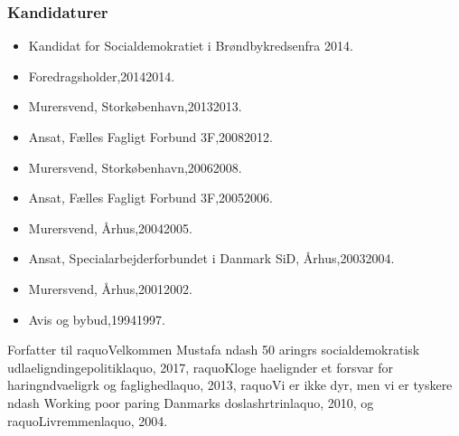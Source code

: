 \documentclass[11pt, a4paper]{awesome-cv}
\begin{document}
\begin{cvletter}
\subsubsection*{Kandidaturer}
\begin{itemize}
\item Kandidat for Socialdemokratiet i Brøndbykredsenfra 2014.
\end{itemize}
\begin{itemize}
\item Foredragsholder,20142014.
\item Murersvend, Storkøbenhavn,20132013.
\item Ansat, Fælles Fagligt Forbund 3F,20082012.
\item Murersvend, Storkøbenhavn,20062008.
\item Ansat, Fælles Fagligt Forbund 3F,20052006.
\item Murersvend, Århus,20042005.
\item Ansat, Specialarbejderforbundet i Danmark SiD, Århus,20032004.
\item Murersvend, Århus,20012002.
\item Avis og bybud,19941997.
\end{itemize}
Forfatter til raquoVelkommen Mustafa ndash 50 aringrs socialdemokratisk udlaeligndingepolitiklaquo, 2017, raquoKloge haelignder  et forsvar for haringndvaeligrk og faglighedlaquo, 2013, raquoVi er ikke dyr, men vi er tyskere ndash Working poor paring Danmarks doslashrtrinlaquo, 2010, og raquoLivremmenlaquo, 2004.

\end{cvletter}
\end{document}
